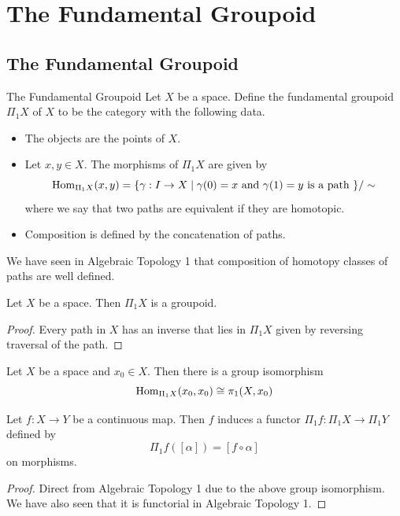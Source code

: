 \documentclass[a4paper]{article}
\begin{document}
\pagebreak
\section{The Fundamental Groupoid}
\subsection{The Fundamental Groupoid}
\begin{defn}{The Fundamental Groupoid}{} Let $X$ be a space. Define the fundamental groupoid $\Pi_1X$ of $X$ to be the category with the following data. 
\begin{itemize}
\item The objects are the points of $X$. 
\item Let $x,y\in X$. The morphisms of $\Pi_1X$ are given by $$\operatorname{Hom}_{\Pi_1X}(x,y)=\{\gamma:I\to X\;|\;\gamma(0)=x\text{ and }\gamma(1)=y\text{ is a path }\}/\sim$$ where we say that two paths are equivalent if they are homotopic. 
\item Composition is defined by the concatenation of paths. 
\end{itemize}
\end{defn}

We have seen in Algebraic Topology 1 that composition of homotopy classes of paths are well defined. 

\begin{lmm}{}{} Let $X$ be a space. Then $\Pi_1X$ is a groupoid. \tcbline
\begin{proof}
Every path in $X$ has an inverse that lies in $\Pi_1X$ given by reversing traversal of the path. 
\end{proof}
\end{lmm}

\begin{lmm}{}{} Let $X$ be a space and $x_0\in X$. Then there is a group isomorphism $$\operatorname{Hom}_{\Pi_1X}(x_0,x_0)\cong\pi_1(X,x_0)$$
\end{lmm}

\begin{prp}{}{} Let $f:X\to Y$ be a continuous map. Then $f$ induces a functor $\Pi_1f:\Pi_1X\to\Pi_1Y$ defined by $$\Pi_1f([\alpha])=[f\circ\alpha]$$ on morphisms. \tcbline
\begin{proof}
Direct from Algebraic Topology 1 due to the above group isomorphism. We have also seen that it is functorial in Algebraic Topology 1. 
\end{proof}
\end{prp}
\end{document}
